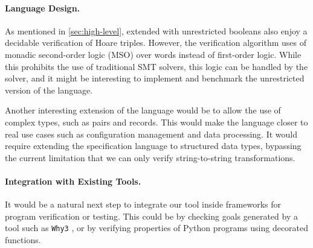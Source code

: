 \paragraph{Language Design.} As mentioned in \cref{sec:high-level},
 extended with unrestricted booleans also enjoy a decidable
verification of Hoare triples. However, the verification algorithm uses of
monadic second-order logic (MSO) over words instead of first-order logic. While
this prohibits the use of traditional SMT solvers, this logic can be handled by
the  solver, and it might be interesting to implement and benchmark
the unrestricted version of the language. 

Another interesting extension of the language would be to allow the use of
complex types, such as pairs and records. This would make the language closer
to real use cases such as configuration management and data processing. It
would require extending the specification language to structured data types,
bypassing the current limitation that we can only verify string-to-string
transformations.


\paragraph{Integration with Existing Tools.} It would be a natural next step to
integrate our tool inside frameworks for program verification or testing. This
could be by checking goals generated by a tool such as \texttt{Why3}
\cite{Why3}, or by verifying properties of Python programs using decorated
functions.
